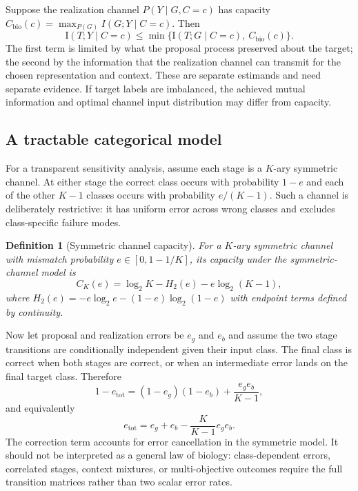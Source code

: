 \documentclass[11pt]{article}
\newtheorem{definition}{Definition}
\newcommand{\I}{\mathrm{I}}
\begin{document}
Suppose the realization channel $P(Y\mid G,C=c)$ has capacity $C_{\mathrm{bio}}(c)=\max_{P(G)} I(G;Y\mid C=c)$. Then
\begin{equation}
\I(T;Y\mid C=c) \leq \min\{\I(T;G\mid C=c),\ C_{\mathrm{bio}}(c)\}.
\label{eq:minbound}
\end{equation}
The first term is limited by what the proposal process preserved about the target; the second by the information that the realization channel can transmit for the chosen representation and context. These are separate estimands and need separate evidence. If target labels are imbalanced, the achieved mutual information and optimal channel input distribution may differ from capacity.

\subsection{A tractable categorical model}
For a transparent sensitivity analysis, assume each stage is a $K$-ary symmetric channel. At either stage the correct class occurs with probability $1-e$ and each of the other $K-1$ classes occurs with probability $e/(K-1)$. Such a channel is deliberately restrictive: it has uniform error across wrong classes and excludes class-specific failure modes.

\begin{definition}[Symmetric channel capacity]
For a $K$-ary symmetric channel with mismatch probability $e\in[0,1-1/K]$, its capacity under the symmetric-channel model is
\begin{equation}
C_K(e)=\log_2 K-H_2(e)-e\log_2(K-1),
\label{eq:capacity}
\end{equation}
where $H_2(e)=-e\log_2 e-(1-e)\log_2(1-e)$ with endpoint terms defined by continuity.
\end{definition}

Now let proposal and realization errors be $e_g$ and $e_b$ and assume the two stage transitions are conditionally independent given their input class. The final class is correct when both stages are correct, or when an intermediate error lands on the final target class. Therefore
\begin{equation}
1-e_{\mathrm{tot}}=(1-e_g)(1-e_b)+\frac{e_g e_b}{K-1},
\label{eq:composition_correct}
\end{equation}
and equivalently
\begin{equation}
e_{\mathrm{tot}}=e_g+e_b-\frac{K}{K-1}e_g e_b.
\label{eq:composition_error}
\end{equation}
The correction term accounts for error cancellation in the symmetric model. It should not be interpreted as a general law of biology: class-dependent errors, correlated stages, context mixtures, or multi-objective outcomes require the full transition matrices rather than two scalar error rates.
\end{document}
